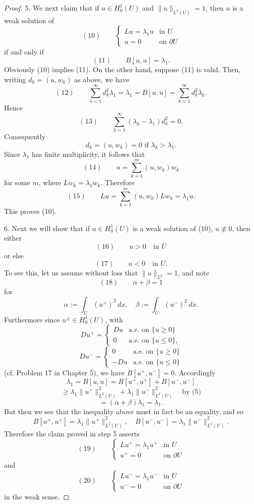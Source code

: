 \begin{proof}
5. We next claim that if $u \in H_0^1(U)$ and $\|u\|_{L^2(U)} = 1$, then $u$ is a weak solution of
$$(10) \qquad \begin{cases} Lu = \lambda_1u & \text{in } U \\ u = 0 & \text{on } \partial U \end{cases}$$
if and only if
$$(11) \qquad B[u,u] = \lambda_1.$$
Obviously (10) implies (11). On the other hand, suppose (11) is valid. Then, writing $d_k = (u,w_k)$ as above, we have
$$(12) \qquad \sum_{k=1}^\infty d_k^2\lambda_1 = \lambda_1 = B[u,u] = \sum_{k=1}^\infty d_k^2\lambda_k.$$
Hence
$$(13) \qquad \sum_{k=1}^\infty (\lambda_k-\lambda_1)d_k^2 = 0.$$
Consequently
$$d_k = (u,w_k) = 0 \text{ if } \lambda_k > \lambda_1.$$
Since $\lambda_1$ has finite multiplicity, it follows that
$$(14) \qquad u = \sum_{k=1}^m (u,w_k)w_k$$
for some $m$, where $Lw_k = \lambda_1w_k$. Therefore
$$(15) \qquad Lu = \sum_{k=1}^m (u,w_k)Lw_k = \lambda_1u.$$
This proves (10).

6. Next we will show that if $u \in H_0^1(U)$ is a weak solution of (10), $u \not\equiv 0$, then either
$$(16) \qquad u > 0 \quad \text{in } U$$
or else
$$(17) \qquad u < 0 \quad \text{in } U.$$
To see this, let us assume without loss that $\|u\|_{L^2} = 1$, and note
$$(18) \qquad \alpha + \beta = 1$$
for
$$\alpha := \int_U (u^+)^2\,dx, \quad \beta := \int_U (u^-)^2\,dx.$$
Furthermore since $u^\pm \in H_0^1(U)$, with
$$Du^+ = \begin{cases} Du & \text{a.e. on } \{u \geq 0\} \\ 0 & \text{a.e. on } \{u \leq 0\}, \end{cases}$$
$$Du^- = \begin{cases} 0 & \text{a.e. on } \{u \geq 0\} \\ -Du & \text{a.e. on } \{u \leq 0\} \end{cases}$$
(cf. Problem 17 in Chapter 5), we have $B[u^+,u^-] = 0$. Accordingly
$$\lambda_1 = B[u,u] = B[u^+,u^+] + B[u^-,u^-]$$
$$\geq \lambda_1\|u^+\|_{L^2(U)}^2 + \lambda_1\|u^-\|_{L^2(U)}^2 \quad \text{by (5)}$$
$$= (\alpha+\beta)\lambda_1 = \lambda_1.$$
But then we see that the inequality above must in fact be an equality, and so
$$B[u^+,u^+] = \lambda_1\|u^+\|_{L^2(U)}^2, \quad B[u^-,u^-] = \lambda_1\|u^-\|_{L^2(U)}^2.$$
Therefore the claim proved in step 5 asserts
$$(19) \qquad \begin{cases} Lu^+ = \lambda_1u^+ & \text{in } U \\ u^+ = 0 & \text{on } \partial U \end{cases}$$
and
$$(20) \qquad \begin{cases} Lu^- = \lambda_1u^- & \text{in } U \\ u^- = 0 & \text{on } \partial U \end{cases}$$
in the weak sense.


\end{proof}
